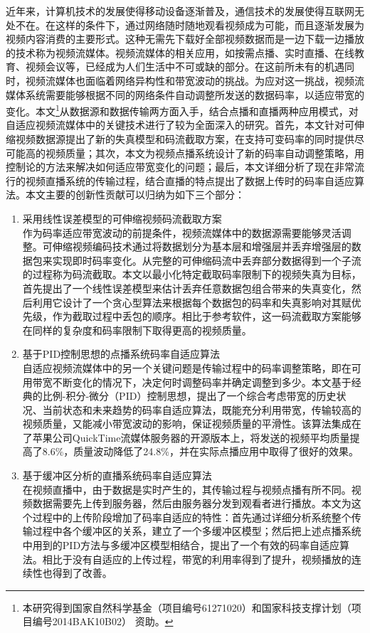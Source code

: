 \begin{cabstract}
近年来，计算机技术的发展使得移动设备逐渐普及，通信技术的发展使得互联网无处不在。在这样的条件下，通过网络随时随地观看视频成为可能，而且逐渐发展为视频内容消费的主要形式。这种无需先下载好全部视频数据而是一边下载一边播放的技术称为视频流媒体。视频流媒体的相关应用，如按需点播、实时直播、在线教育、视频会议等，已经成为人们生活中不可或缺的部分。在这前所未有的机遇同时，视频流媒体也面临着网络异构性和带宽波动的挑战。为应对这一挑战，视频流媒体系统需要能够根据不同的网络条件自动调整所发送的数据码率，以适应带宽的变化。本文\footnote{本研究得到国家自然科学基金（项目编号61271020）和国家科技支撑计划（项目编号2014BAK10B02） 资助。}从数据源和数据传输两方面入手，结合点播和直播两种应用模式，对自适应视频流媒体中的关键技术进行了较为全面深入的研究。首先，本文针对可伸缩视频数据源提出了新的失真模型和码流截取方案，在支持可变码率的同时提供尽可能高的视频质量；其次，本文为视频点播系统设计了新的码率自动调整策略，用控制论的方法来解决如何适应带宽变化的问题；最后，本文详细分析了现在非常流行的视频直播系统的传输过程，结合直播的特点提出了数据上传时的码率自适应算法。本文主要的创新性贡献可以归纳为如下三个部分：
\begin{enumerate}
\item {采用线性误差模型的可伸缩视频码流截取方案}\\
作为码率适应带宽波动的前提条件，视频流媒体中的数据源需要能够灵活调整。可伸缩视频编码技术通过将数据划分为基本层和增强层并丢弃增强层的数据包来实现即时码率变化。从完整的可伸缩码流中丢弃部分数据得到一个子流的过程称为码流截取。本文以最小化特定截取码率限制下的视频失真为目标，首先提出了一个线性误差模型来估计丢弃任意数据包组合带来的失真变化，然后利用它设计了一个贪心型算法来根据每个数据包的码率和失真影响对其赋优先级，作为截取过程中丢包的顺序。相比于参考软件，这一码流截取方案能够在同样的复杂度和码率限制下取得更高的视频质量。
\item {基于PID控制思想的点播系统码率自适应算法}\\
自适应视频流媒体中的另一个关键问题是传输过程中的码率调整策略，即在可用带宽不断变化的情况下，决定何时调整码率并确定调整到多少。本文基于经典的比例-积分-微分（PID）控制思想，提出了一个综合考虑带宽的历史状况、当前状态和未来趋势的码率自适应算法，既能充分利用带宽，传输较高的视频质量，又能减小带宽波动的影响，保证视频质量的平滑性。该算法集成在了苹果公司QuickTime流媒体服务器的开源版本上，将发送的视频平均质量提高了8.6\%，质量波动降低了24.8\%，并在实际点播应用中取得了很好的效果。
\item {基于缓冲区分析的直播系统码率自适应算法}\\
在视频直播中，由于数据是实时产生的，其传输过程与视频点播有所不同。视频数据需要先上传到服务器，然后由服务器分发到观看者进行播放。本文为这个过程中的上传阶段增加了码率自适应的特性：首先通过详细分析系统整个传输过程中各个缓冲区的关系，建立了一个多缓冲区模型；然后把上述点播系统中用到的PID方法与多缓冲区模型相结合，提出了一个有效的码率自适应算法。相比于没有自适应的上传过程，带宽的利用率得到了提升，视频播放的连续性也得到了改善。
\end{enumerate}
\end{cabstract}

